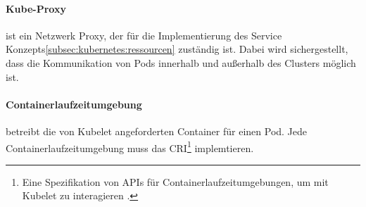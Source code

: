 \paragraph{Kube-Proxy} ist ein Netzwerk Proxy, der für die Implementierung des Service Konzepts\ref{subsec:kubernetes:ressourcen}
zuständig ist. 
Dabei wird sichergestellt, dass die Kommunikation von Pods innerhalb und außerhalb des Clusters möglich ist.
\paragraph{Containerlaufzeitumgebung} betreibt die von Kubelet angeforderten Container für einen Pod. 
Jede Containerlaufzeitumgebung muss das 
\ac{CRI}\footnote{Eine Spezifikation von APIs für Containerlaufzeitumgebungen, um mit Kubelet zu interagieren \cite{cri}.} implemtieren.
